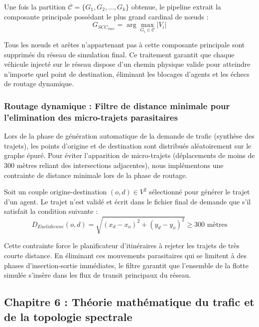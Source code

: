\documentclass[10pt, a4paper]{article}
\begin{document}
Une fois la partition \(\mathcal{C} = \{G_1, G_2, \dots, G_k\}\)
obtenue, le pipeline extrait la composante principale possédant le plus
grand cardinal de nœuds :
\[G_{SCC_{max}} = \arg\max_{G_i \in \mathcal{C}} |V_i|\]

Tous les nœuds et arêtes n'appartenant pas à cette composante principale
sont supprimés du réseau de simulation final. Ce traitement garantit que
chaque véhicule injecté sur le réseau dispose d'un chemin physique
valide pour atteindre n'importe quel point de destination, éliminant les
blocages d'agents et les échecs de routage dynamique.

\subsubsection{Routage dynamique : Filtre de distance minimale pour
l'elimination des micro-trajets
parasitaires}\label{routage-dynamique-filtre-de-distance-minimale-pour-lelimination-des-micro-trajets-parasitaires}

Lors de la phase de génération automatique de la demande de trafic
(synthèse des trajets), les points d'origine et de destination sont
distribués aléatoirement sur le graphe épuré. Pour éviter l'apparition
de micro-trajets (déplacements de moins de 300 mètres reliant des
intersections adjacentes), nous implémentons une contrainte de distance
minimale lors de la phase de routage.

Soit un couple origine-destination \((o, d) \in V^2\) sélectionné pour
générer le trajet d'un agent. Le trajet n'est validé et écrit dans le
fichier final de demande que s'il satisfait la condition suivante :
\[D_{Euclidienne}(o, d) = \sqrt{(x_d - x_o)^2 + (y_d - y_o)^2} \ge 300 \text{ mètres}\]

Cette contrainte force le planificateur d'itinéraires à rejeter les
trajets de très courte distance. En éliminant ces mouvements
parasitaires qui se limitent à des phases d'insertion-sortie immédiates,
le filtre garantit que l'ensemble de la flotte simulée s'insère dans les
flux de transit principaux du réseau.

\newpage

\subsection{Chapitre 6 : Théorie mathématique du trafic et de la
topologie
spectrale}\label{chapitre-6-thuxe9orie-mathuxe9matique-du-trafic-et-de-la-topologie-spectrale}
\end{document}
